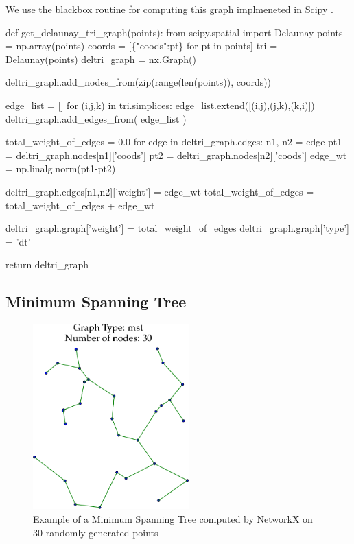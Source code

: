 We use the  \href{https://docs.scipy.org/doc/scipy/reference/generated/scipy.spatial.Delaunay.html}{blackbox routine} 
for computing this graph implmeneted in Scipy \cite{virtanen2020scipy}. 

\nwenddocs{}\plusendmoddef\nwstartdeflinemarkup{}\nwenddeflinemarkup
def get_delaunay_tri_graph(points):
     from scipy.spatial import Delaunay
     points       = np.array(points)
     coords       = [\{"coods":pt\} for pt in points]
     tri          = Delaunay(points)
     deltri_graph = nx.Graph()

     deltri_graph.add_nodes_from(zip(range(len(points)), coords))

     edge_list = []
     for (i,j,k) in tri.simplices:
         edge_list.extend([(i,j),(j,k),(k,i)])    
     deltri_graph.add_edges_from(  edge_list  )
     
     total_weight_of_edges = 0.0
     for edge in deltri_graph.edges:
           n1, n2 = edge
           pt1 = deltri_graph.nodes[n1]['coods'] 
           pt2 = deltri_graph.nodes[n2]['coods']
           edge_wt = np.linalg.norm(pt1-pt2)

           deltri_graph.edges[n1,n2]['weight'] = edge_wt
           total_weight_of_edges = total_weight_of_edges + edge_wt 
     
     deltri_graph.graph['weight'] = total_weight_of_edges
     deltri_graph.graph['type']   = 'dt'

     return deltri_graph
\nwendcode{}\nwdocspar


\subsection{Minimum Spanning Tree}

\begin{figure}[ht]
  \centering
  \includegraphics[width=6cm]{./miscimages/mst-example.png}
  \caption{\label{fig:mst} Example of a Minimum Spanning Tree computed by NetworkX on 30 randomly generated points}
\end{figure}


